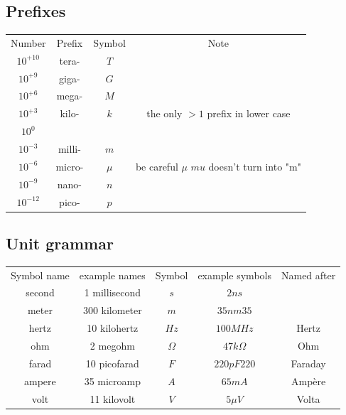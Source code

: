 \subsection{Prefixes}
\begin{center}
\begin{tabular}{ c c c c }
 Number    & Prefix & Symbol & Note \\
 $10^{+10}$ & tera-  & $T$    &   \\
 $10^{+9}$  & giga-  & $G$    &   \\
 $10^{+6}$  & mega-  & $M$    &   \\
 $10^{+3}$  & kilo-  & $k$    & the only $> 1$ prefix in lower case \\
 $10^{0}$   &        &        &   \\
 $10^{-3}$  & milli- & $m$    &   \\
 $10^{-6}$  & micro- & $\mu$  &  be careful $\mu$ \(mu\) doesn't turn into "m" \\
 $10^{-9}$  & nano-  & $n$    &   \\
 $10^{-12}$ & pico-  & $p$    &   \\
\end{tabular}
\end{center}

\subsection{Unit grammar}
\begin{center}
\begin{tabular}{ c c c c c }
 Symbol name & example names & Symbol & example symbols & Named after \\
 second & 1 millisecond & $s$      & $2 ns$       &    \\
 meter  & 300 kilometer & $m$      & $35 nm35$    &    \\
 hertz  & 10 kilohertz  & $Hz$     & $100 MHz$    &  Hertz  \\
 ohm    & 2 megohm      & $\Omega$ & $47 k\Omega$ &  Ohm  \\
 farad  & 10 picofarad  & $F$      & $220 pF220$  &  Faraday  \\
 ampere & 35 microamp   & $A$      & $65 mA$      &  Ampère  \\
 volt   & 11 kilovolt   & $V$      & $5\mu{V}$    &  Volta  \\
\end{tabular}
\end{center}


